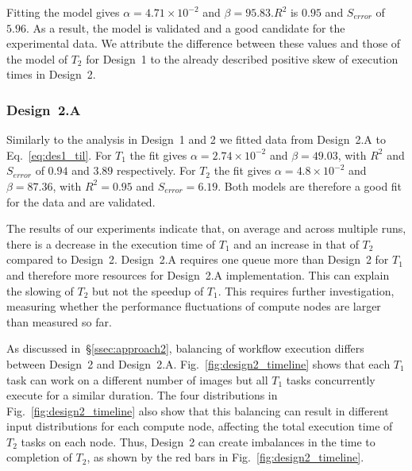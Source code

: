 Fitting the model gives $\alpha = 4.71 \times 10^{-2}$ and
$\beta = 95.83$.$R^{2}$ is $0.95$ and $S_{error}$ of $5.96$. As a result, the
model is validated and a good candidate for the experimental data. We
attribute the difference between these values and those of the model of
$T_{2}$ for Design~1 to the already described positive skew of execution times
in Design~2.

\subsubsection{Design~2.A}

Similarly to the analysis in Design~1 and 2 we fitted data from Design~2.A to
Eq.~\ref{eq:des1_til}. For $T_{1}$ the fit gives $\alpha=2.74\times10^{-2}$ and
$\beta=49.03$, with $R^{2}$ and $S_{error}$ of $0.94$ and $3.89$ respectively.
For $T_{2}$ the fit gives $\alpha=4.8\times10^{-2}$ and $\beta=87.36$, with
$R^{2}=0.95$ and $S_{error}=6.19$. Both models are therefore a good fit for the
data and are validated.

The results of our experiments indicate that, on average and across multiple
runs, there is a decrease in the execution time of $T_{1}$ and an increase in
that of $T_{2}$ compared to Design~2. Design~2.A requires one queue more than
Design~2 for $T_{1}$ and therefore more resources for Design~2.A
implementation. This can explain the slowing of $T_{2}$ but not the speedup of
$T_{1}$. This requires further investigation, measuring whether the
performance fluctuations of compute nodes are larger than measured so far.

As discussed in~\S\ref{ssec:approach2}, balancing of workflow execution
differs between Design~2 and Design~2.A. Fig.~\ref{fig:design2_timeline} shows
that each $T_{1}$ task can work on a different number of images but all
$T_{1}$ tasks concurrently execute for a similar duration. The four
distributions in Fig.~\ref{fig:design2_timeline} also show that this balancing
can result in different input distributions for each compute node, affecting
the total execution time of $T_{2}$ tasks on each node. Thus, Design~2 can
create imbalances in the time to completion of $T_{2}$, as shown by the red
bars in Fig.~\ref{fig:design2_timeline}.

